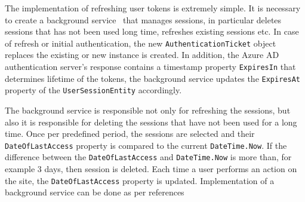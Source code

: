 The implementation of refreshing user tokens is extremely simple.
It is necessary to create a background service~\cite{microsoftHostedservice2023} that manages sessions,
in particular deletes sessions that has not been used long time, refreshes existing sessions etc.
In case of refresh or initial authentication, the new \texttt{AuthenticationTicket} object~\cite{microsoftAuthenticationTicket2023}
replaces the existing or new instance is created.
In addition, the Azure AD authentication server's response contains a timestamp property \texttt{ExpiresIn}
that determines lifetime of the tokens,
the background service updates the \texttt{ExpiresAt} property of the \texttt{UserSessionEntity} accordingly.

The background service is responsible not only for refreshing the sessions,
but also it is responsible for deleting the sessions that have not been used for a long time.
Once per predefined period, the sessions are selected and their \texttt{DateOfLastAccess} property is
compared to the current \texttt{DateTime.Now}.
If the difference between the \texttt{DateOfLastAccess} and \texttt{DateTime.Now} is more than, for example 3 days,
then session is deleted.
Each time a user performs an action on the site, the \texttt{DateOfLastAccess} property is updated.
Implementation of a background service can be done as per references~\cite{backroundService_2023, configurationBackgroundService_2023}